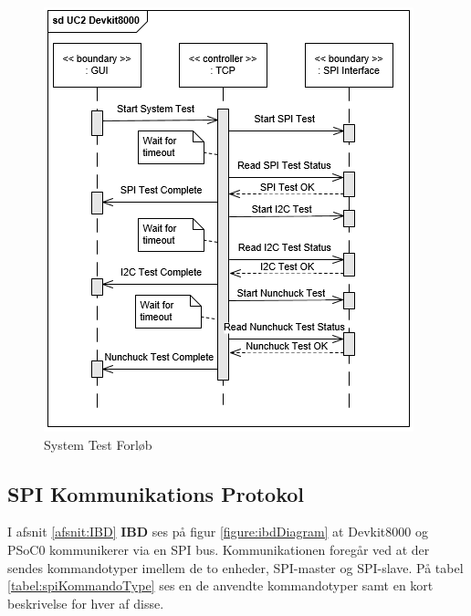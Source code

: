\begin{figure}[H]
	\centering
	\includegraphics[width=\textwidth] {Systemarkitektur/images/DevKit8000SequenceDiagram}
	\caption{System Test Forløb}
	\label{fig:SystemTestSekvensDiagram}
\end{figure}

\subsection{SPI Kommunikations Protokol}
I afsnit \ref{afsnit:IBD} \textbf{IBD} ses på figur \ref{figure:ibdDiagram} at Devkit8000 og PSoC0 kommunikerer via en SPI bus. Kommunikationen foregår ved at der sendes kommandotyper imellem de to enheder, SPI-master og SPI-slave. På tabel \ref{tabel:spiKommandoType} ses en de anvendte kommandotyper samt en kort beskrivelse for hver af disse.

